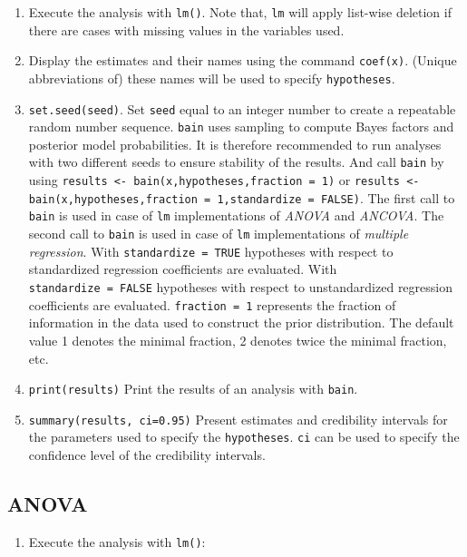 \documentclass[
]{book}
\providecommand{\tightlist}{%
  \setlength{\itemsep}{0pt}\setlength{\parskip}{0pt}}
\begin{document}
\begin{enumerate}
\def\labelenumi{\arabic{enumi})}
\item
  Execute the analysis with \texttt{lm()}. Note that, \texttt{lm} will apply list-wise deletion if there are cases with missing values in the variables used.
\item
  Display the estimates and their names using the command \texttt{coef(x)}. (Unique abbreviations of) these names will be used to specify \texttt{hypotheses}.
\item
  \texttt{set.seed(seed)}. Set \texttt{seed} equal to an integer
  number to create a repeatable random number sequence. \texttt{bain} uses sampling to compute Bayes factors and posterior model probabilities. It is therefore recommended to run analyses with two different seeds to ensure stability of the results.
  And call \texttt{bain} by using \texttt{results\ \textless{}-\ bain(x,hypotheses,fraction\ =\ 1)} or
  \texttt{results\ \textless{}-bain(x,hypotheses,fraction\ =\ 1,standardize\ =\ FALSE)}. The first call to
  \texttt{bain} is used in case of \texttt{lm} implementations of \emph{ANOVA} and \emph{ANCOVA}. The
  second call to \texttt{bain} is used in case of \texttt{lm} implementations of
  \emph{multiple regression}. With \texttt{standardize\ =\ TRUE} hypotheses with respect
  to standardized regression coefficients are evaluated. With \texttt{standardize\ =\ FALSE} hypotheses with respect to unstandardized regression coefficients
  are evaluated. \texttt{fraction\ =\ 1} represents the fraction of information in the data used to construct the prior distribution. The default value 1 denotes the minimal fraction, 2 denotes twice the minimal fraction, etc.
\item
  \texttt{print(results)} Print the results of an analysis with
  \texttt{bain}.
\item
  \texttt{summary(results,\ ci=0.95)} Present estimates and credibility intervals for the parameters used to specify the \texttt{hypotheses}. \texttt{ci} can be used to specify the confidence level of the credibility intervals.
\end{enumerate}

\hypertarget{anova}{%
\subsection{ANOVA}\label{anova}}

\begin{enumerate}
\def\labelenumi{\arabic{enumi})}
\tightlist
\item
  Execute the analysis with \texttt{lm()}:
\end{enumerate}
\end{document}
